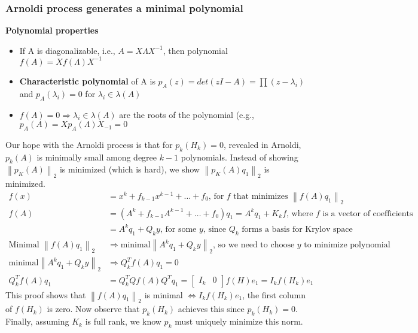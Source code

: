 \documentclass{article}
\newcommand{\norm}[2]{\left\lVert#1\right\rVert_#2}
\begin{document}
\subsubsection{Arnoldi process generates a minimal polynomial}
\textbf{Polynomial properties}
\begin{itemize}
    \item If A is diagonalizable, i.e., $A = X\Lambda X^{-1}$, then polynomial $f(A) = Xf(\Lambda)X^{-1}$
    \item \textbf{Characteristic polynomial} of A is $p_A(z) = det(zI - A) = \prod(z - \lambda_i)$ and $p_A(\lambda_i) = 0$ for $\lambda_i \in \lambda(A)$
    \item $f(A) = 0 \Longrightarrow \lambda_i \in \lambda(A)$ are the roots of the polynomial (e.g., $p_A(A) = Xp_A(\Lambda)X_{-1} = 0$
\end{itemize}
Our hope with the Arnoldi process is that for $p_k(H_k) = 0$, revealed in Arnoldi, $p_k(A)$ is minimally small among degree $k-1$ polynomials. Instead of showing $\norm{p_K(A)}{2}$ is minimized (which is hard), we show $\norm{p_K(A)q_1}{2}$ is minimized.
\begin{align*}
    f(x) &= x^k + f_{k-1}x^{k-1} + \dots + f_0 \textrm{, for $f$ that minimizes } \norm{f(A)q_1}{2}\\
    f(A) &= (A^k + f_{k-1}A^{k-1} + \dots + f_0)q_1 = A^kq_1 + K_kf \textrm{, where $f$ is a vector of coefficients}\\
    &= A^kq_1 + Q_ky \textrm{, for some $y$, since $Q_k$ forms a basis for Krylov space}\\
    \textrm{Minimal }\norm{f(A)q_1}{2} &\Longrightarrow \textrm{minimal} \norm{A^kq_1 + Q_ky}{2} \textrm{, so we need to choose $y$ to minimize polynomial}\\
    \textrm{minimal} \norm{A^kq_1 + Q_ky}{2} & \Longrightarrow Q_k^Tf(A)q_1 = 0\\
    Q_k^Tf(A)q_1 &= Q_k^TQf(A)Q^Tq_1 = \begin{bmatrix} I_k & 0 \end{bmatrix} f(H)e_1 = I_kf(H_k)e_1
\end{align*}
This proof shows that $\norm{f(A)q_1}{2}$ is minimal $\Leftrightarrow I_kf(H_k)e_1$, the first column of $f(H_k)$ is zero. Now observe that $p_k(H_k)$ achieves this since $p_k(H_k) = 0$. Finally, assuming $K_k$ is full rank, we know $p_k$ must uniquely minimize this norm. 

\end{document}
